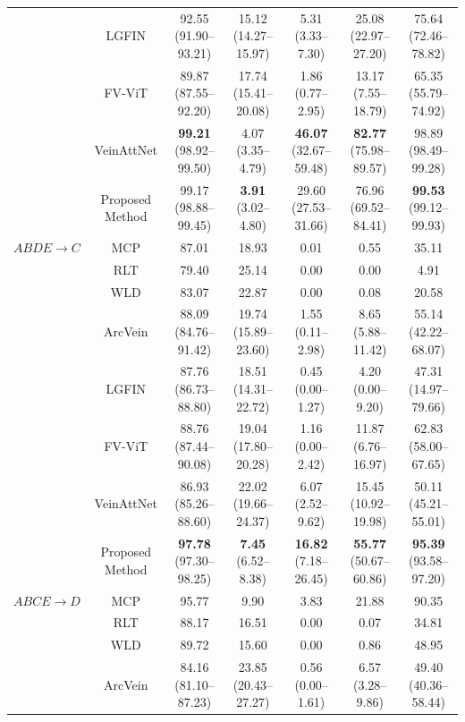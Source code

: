 \documentclass[10pt,journal,compsoc]{IEEEtran}
\begin{document}
\begin{table}[ht!]
{\begin{tabular}{|c|c|c|c|c|c|c|}
         & LGFIN \cite{lgfin} & 92.55 (91.90--93.21) & 15.12 (14.27--15.97) & 5.31 (3.33--7.30) & 25.08 (22.97--27.20) & 75.64 (72.46--78.82) \\
         & FV-ViT \cite{vit} & 89.87 (87.55--92.20) & 17.74 (15.41--20.08) & 1.86 (0.77--2.95) & 13.17 (7.55--18.79) & 65.35 (55.79--74.92) \\
         & VeinAttNet \cite{veinatnnet} & \textbf{99.21} (98.92--99.50) & 4.07 (3.35--4.79) & \textbf{46.07} (32.67--59.48) & \textbf{82.77} (75.98--89.57) & 98.89 (98.49--99.28) \\
         & Proposed Method & 99.17 (98.88--99.45) & \textbf{3.91} (3.02--4.80) & 29.60 (27.53--31.66) & 76.96 (69.52--84.41) & \textbf{99.53} (99.12--99.93) \\
        \hline
        $ABDE \rightarrow C$ & MCP \cite{mcp} & 87.01 & 18.93 & 0.01 & 0.55 & 35.11 \\
         & RLT \cite{rlt} & 79.40 & 25.14 & 0.00 & 0.00 & 4.91 \\
         & WLD \cite{wld} & 83.07 & 22.87 & 0.00 & 0.08 & 20.58 \\
         & ArcVein \cite{arcvein} & 88.09 (84.76--91.42) & 19.74 (15.89--23.60) & 1.55 (0.11--2.98) & 8.65 (5.88--11.42) & 55.14 (42.22--68.07) \\
         & LGFIN \cite{lgfin} & 87.76 (86.73--88.80) & 18.51 (14.31--22.72) & 0.45 (0.00--1.27) & 4.20 (0.00--9.20) & 47.31 (14.97--79.66) \\
         & FV-ViT \cite{vit} & 88.76 (87.44--90.08) & 19.04 (17.80--20.28) & 1.16 (0.00--2.42) & 11.87 (6.76--16.97) & 62.83 (58.00--67.65) \\
         & VeinAttNet \cite{veinatnnet} & 86.93 (85.26--88.60) & 22.02 (19.66--24.37) & 6.07 (2.52--9.62) & 15.45 (10.92--19.98) & 50.11 (45.21--55.01) \\
         & Proposed Method & \textbf{97.78} (97.30--98.25) & \textbf{7.45} (6.52--8.38) & \textbf{16.82} (7.18--26.45) & \textbf{55.77} (50.67--60.86) & \textbf{95.39} (93.58--97.20) \\
        \hline
        $ABCE \rightarrow D$ & MCP \cite{mcp} & 95.77 & 9.90 & 3.83 & 21.88 & 90.35 \\
         & RLT \cite{rlt} & 88.17 & 16.51 & 0.00 & 0.07 & 34.81 \\
         & WLD \cite{wld} & 89.72 & 15.60 & 0.00 & 0.86 & 48.95 \\
         & ArcVein \cite{arcvein} & 84.16 (81.10--87.23) & 23.85 (20.43--27.27) & 0.56 (0.00--1.61) & 6.57 (3.28--9.86) & 49.40 (40.36--58.44) \\

\end{tabular}}
\end{table}
\end{document}

